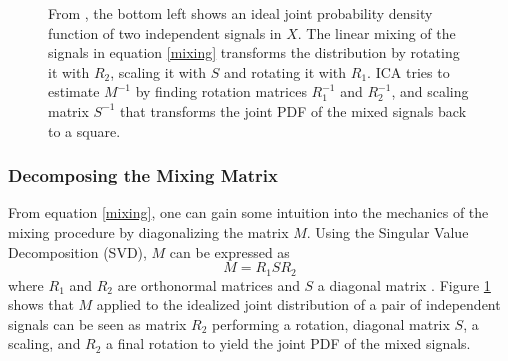 \begin{figure}[thp]
  \begin{center}
    \caption{From \cite{Farid:99}, the bottom left shows an
      ideal joint probability density function of two independent
      signals in $X$. The linear mixing of the signals in equation
      \ref{mixing} transforms the distribution by rotating 
      it with $R_{2}$, scaling it with $S$ and rotating it with
      $R_{1}$. ICA tries to estimate $M^{-1}$ by finding rotation
      matrices $R_{1}^{-1}$ and $R_{2}^{-1}$, and scaling matrix
      $S^{-1}$ that transforms the joint PDF of the mixed signals back to a
      square.}
    \label{MixingUnmixing}
  \end{center}
\end{figure}

\vspace{5mm}
\subsubsection{Decomposing the Mixing Matrix}

From equation \ref{mixing}, one can gain some intuition into the
mechanics of the mixing procedure by diagonalizing the matrix $M$.
Using the Singular Value Decomposition (SVD), $M$ can be expressed as 
\begin{equation}
  \label{SVD}
  M = R_{1}SR_{2}
\end{equation} where $R_{1}$ and $R_{2}$ are orthonormal matrices and
$S$ a diagonal matrix \cite{Farid:99}. Figure \ref{MixingUnmixing}
shows that $M$ applied to the idealized joint distribution of a pair of independent
signals can be seen as matrix $R_{2}$ performing a rotation, diagonal
matrix $S$, a scaling, and $R_{2}$ a final rotation to yield the 
joint PDF of the mixed signals.

